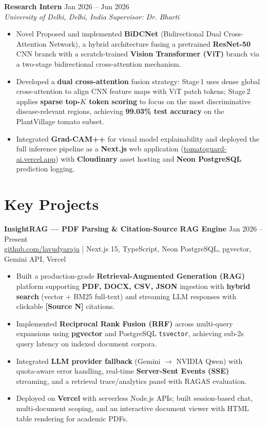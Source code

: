 \documentclass[11pt,letterpaper]{article}
\begin{document}
\textbf{Research Intern} \hfill Jan 2026 -- Jun 2026 \\
\textit{University of Delhi, Delhi, India} \hfill \textit{Supervisor: Dr. Bharti}
\begin{itemize}
  \item Novel Proposed and implemented \textbf{BiDCNet} (Bidirectional Dual Cross-Attention Network), a hybrid architecture fusing a pretrained \textbf{ResNet-50} CNN branch with a scratch-trained \textbf{Vision Transformer (ViT)} branch via a two-stage bidirectional cross-attention mechanism.
  \item Developed a \textbf{dual cross-attention} fusion strategy: Stage\,1 uses dense global cross-attention to align CNN feature maps with ViT patch tokens; Stage\,2 applies \textbf{sparse top-$K$ token scoring} to focus on the most discriminative disease-relevant regions, achieving \textbf{99.03\% test accuracy} on the PlantVillage tomato subset.
  \item Integrated \textbf{Grad-CAM++} for visual model explainability and deployed the full inference pipeline as a \textbf{Next.js} web application (\href{https://tomatoguard-ai.vercel.app}{tomatoguard-ai.vercel.app}) with \textbf{Cloudinary} asset hosting and \textbf{Neon PostgreSQL} prediction logging.
\end{itemize}

\vspace{4pt}

\section{Key Projects}

\textbf{InsightRAG --- PDF Parsing \& Citation-Source RAG Engine} \hfill Jan 2026 -- Present \\
\href{https://github.com/lavudyaraja}{github.com/lavudyaraja} \;|\; Next.js 15, TypeScript, Neon PostgreSQL, pgvector, Gemini API, Vercel
\begin{itemize}
  \item Built a production-grade \textbf{Retrieval-Augmented Generation (RAG)} platform supporting \textbf{PDF, DOCX, CSV, JSON} ingestion with \textbf{hybrid search} (vector + BM25 full-text) and streaming LLM responses with clickable \textbf{[Source N]} citations.
  \item Implemented \textbf{Reciprocal Rank Fusion (RRF)} across multi-query expansions using \textbf{pgvector} and PostgreSQL \texttt{tsvector}, achieving sub-2s query latency on indexed document corpora.
  \item Integrated \textbf{LLM provider fallback} (Gemini $\rightarrow$ NVIDIA Qwen) with quota-aware error handling, real-time \textbf{Server-Sent Events (SSE)} streaming, and a retrieval trace/analytics panel with RAGAS evaluation.
  \item Deployed on \textbf{Vercel} with serverless Node.js APIs; built session-based chat, multi-document scoping, and an interactive document viewer with HTML table rendering for academic PDFs.
\end{itemize}
\end{document}
